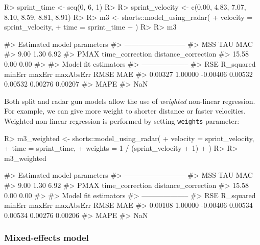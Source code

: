 \documentclass[
]{jss}
\begin{document}
\begin{CodeChunk}
\begin{CodeInput}
R> sprint_time <- seq(0, 6, 1)
R> 
R> sprint_velocity <- c(0.00, 4.83, 7.07, 8.10, 8.59, 8.81, 8.91)
R> 
R> m3 <- shorts::model_using_radar(
+   velocity = sprint_velocity,
+   time = sprint_time
+ )
R> 
R> m3
\end{CodeInput}
\begin{CodeOutput}
#> Estimated model parameters
#> --------------------------
#>                 MSS                 TAU                 MAC 
#>                9.00                1.30                6.92 
#>                PMAX     time_correction distance_correction 
#>               15.58                0.00                0.00 
#> 
#> Model fit estimators
#> --------------------
#>       RSE R_squared    minErr    maxErr maxAbsErr      RMSE       MAE 
#>   0.00327   1.00000  -0.00406   0.00532   0.00532   0.00276   0.00207 
#>      MAPE 
#>       NaN
\end{CodeOutput}
\end{CodeChunk}

Both split and radar gun models allow the use of \emph{weighted} non-linear regression. For example, we can give more weight to shorter distance or faster velocities. Weighted non-linear regression is performed by setting \texttt{weights} parameter:

\begin{CodeChunk}
\begin{CodeInput}
R> m3_weighted <- shorts::model_using_radar(
+   velocity = sprint_velocity,
+   time = sprint_time,
+   weights = 1 / (sprint_velocity + 1)
+ )
R> 
R> m3_weighted
\end{CodeInput}
\begin{CodeOutput}
#> Estimated model parameters
#> --------------------------
#>                 MSS                 TAU                 MAC 
#>                9.00                1.30                6.92 
#>                PMAX     time_correction distance_correction 
#>               15.58                0.00                0.00 
#> 
#> Model fit estimators
#> --------------------
#>       RSE R_squared    minErr    maxErr maxAbsErr      RMSE       MAE 
#>   0.00108   1.00000  -0.00406   0.00534   0.00534   0.00276   0.00206 
#>      MAPE 
#>       NaN
\end{CodeOutput}
\end{CodeChunk}

\hypertarget{mixed-effects-model-1}{%
\subsubsection{Mixed-effects model}\label{mixed-effects-model-1}}
\end{document}
